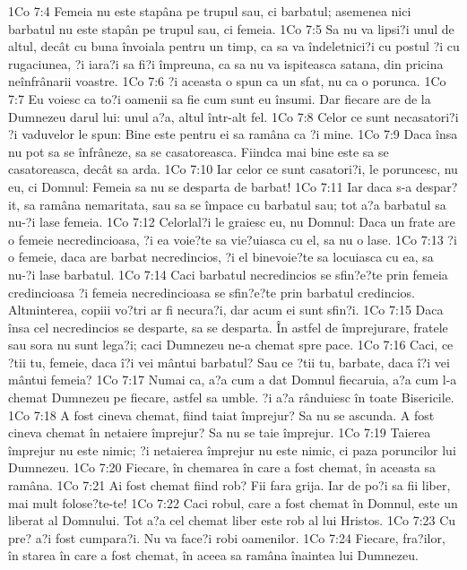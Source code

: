 1Co 7:4  Femeia nu este stapâna pe trupul sau, ci barbatul; asemenea nici barbatul nu este stapân pe trupul sau, ci femeia.
1Co 7:5  Sa nu va lipsi?i unul de altul, decât cu buna învoiala pentru un timp, ca sa va îndeletnici?i cu postul ?i cu rugaciunea, ?i iara?i sa fi?i împreuna, ca sa nu va ispiteasca satana, din pricina neînfrânarii voastre.
1Co 7:6  ?i aceasta o spun ca un sfat, nu ca o porunca.
1Co 7:7  Eu voiesc ca to?i oamenii sa fie cum sunt eu însumi. Dar fiecare are de la Dumnezeu darul lui: unul a?a, altul într-alt fel.
1Co 7:8  Celor ce sunt necasatori?i ?i vaduvelor le spun: Bine este pentru ei sa ramâna ca ?i mine.
1Co 7:9  Daca însa nu pot sa se înfrâneze, sa se casatoreasca. Fiindca mai bine este sa se casatoreasca, decât sa arda.
1Co 7:10  Iar celor ce sunt casatori?i, le poruncesc, nu eu, ci Domnul: Femeia sa nu se desparta de barbat!
1Co 7:11  Iar daca s-a despar?it, sa ramâna nemaritata, sau sa se împace cu barbatul sau; tot a?a barbatul sa nu-?i lase femeia.
1Co 7:12  Celorlal?i le graiesc eu, nu Domnul: Daca un frate are o femeie necredincioasa, ?i ea voie?te sa vie?uiasca cu el, sa nu o lase.
1Co 7:13  ?i o femeie, daca are barbat necredincios, ?i el binevoie?te sa locuiasca cu ea, sa nu-?i lase barbatul.
1Co 7:14  Caci barbatul necredincios se sfin?e?te prin femeia credincioasa ?i femeia necredincioasa se sfin?e?te prin barbatul credincios. Altminterea, copiii vo?tri ar fi necura?i, dar acum ei sunt sfin?i.
1Co 7:15  Daca însa cel necredincios se desparte, sa se desparta. În astfel de împrejurare, fratele sau sora nu sunt lega?i; caci Dumnezeu ne-a chemat spre pace.
1Co 7:16  Caci, ce ?tii tu, femeie, daca î?i vei mântui barbatul? Sau ce ?tii tu, barbate, daca î?i vei mântui femeia?
1Co 7:17  Numai ca, a?a cum a dat Domnul fiecaruia, a?a cum l-a chemat Dumnezeu pe fiecare, astfel sa umble. ?i a?a rânduiesc în toate Bisericile.
1Co 7:18  A fost cineva chemat, fiind taiat împrejur? Sa nu se ascunda. A fost cineva chemat în netaiere împrejur? Sa nu se taie împrejur.
1Co 7:19  Taierea împrejur nu este nimic; ?i netaierea împrejur nu este nimic, ci paza poruncilor lui Dumnezeu.
1Co 7:20  Fiecare, în chemarea în care a fost chemat, în aceasta sa ramâna.
1Co 7:21  Ai fost chemat fiind rob? Fii fara grija. Iar de po?i sa fii liber, mai mult folose?te-te!
1Co 7:22  Caci robul, care a fost chemat în Domnul, este un liberat al Domnului. Tot a?a cel chemat liber este rob al lui Hristos.
1Co 7:23  Cu pre? a?i fost cumpara?i. Nu va face?i robi oamenilor.
1Co 7:24  Fiecare, fra?ilor, în starea în care a fost chemat, în aceea sa ramâna înaintea lui Dumnezeu.
